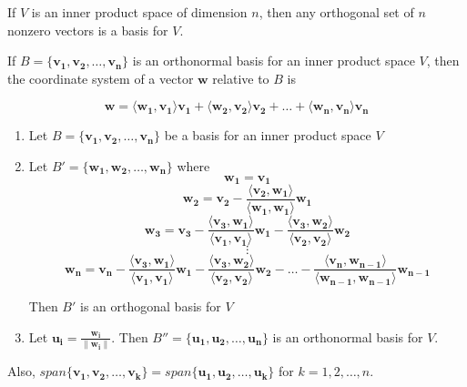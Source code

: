 \documentclass{report}
\begin{document}
\begin{tcolorbox}[title = Corollary]
	If $V$ is an inner product space of dimension $n$, then any orthogonal set of $n$ nonzero vectors is a basis for $V$.
\end{tcolorbox}

\begin{tcolorbox}[title = Coordinates Relative to an Orthonormal Basis]
	If $B= \{ \bm{v_1}, \bm{v_2}, \hdots, \bm{v_n}\}$ is an orthonormal basis for an inner product space $V$, then the coordinate system of a vector $\bm{w}$ relative to $B$ is 
	
	$$
	\bm{w} = \langle \bm{w_1}, \bm{v_1} \rangle \bm{v_1} + \langle \bm{w_2}, \bm{v_2} \rangle \bm{v_2} + \hdots + \langle \bm{w_n}, \bm{v_n} \rangle \bm{v_n}
	$$
\end{tcolorbox}

\begin{tcolorbox}[title = Gram-Schmidt Orthonormalization Process]
	\begin{enumerate}
			\item Let $B = \{ \bm{v_1}, \bm{v_2}, \hdots, \bm{v_n} \}$ be a basis for an inner product space $V$
			\item Let $B' = \{ \bm{w_1}, \bm{w_2}, \hdots, \bm{w_n} \}$ where
			$$
			\bm{w_1} = \bm{v_1}
			$$
			$$\bm{w_2} = \bm{v_2} - \frac{\langle \bm{v_2}, \bm{w_1} \rangle}{\langle \bm{w_1}, \bm{w_1} \rangle} \bm{w_1}	
			$$
			$$
			\bm{w_3} = \bm{v_3} - \frac{\langle \bm{v_3}, \bm{w_1} \rangle}{\langle \bm{v_1}, \bm{v_1} \rangle} \bm{w_1} - \frac{\langle \bm{v_3}, \bm{w_2}\rangle}{\langle \bm{v_2}, \bm{v_2} \rangle} \bm{w_2}
			$$
			$$
			\vdots
			$$
			$$
			\bm{w_n} = \bm{v_n} - \frac{\langle \bm{v_3}, \bm{w_1} \rangle}{\langle \bm{v_1}, \bm{v_1} \rangle} \bm{w_1} - \frac{\langle \bm{v_3}, \bm{w_2}\rangle}{\langle \bm{v_2}, \bm{v_2} \rangle} \bm{w_2} - \hdots - \frac{\langle \bm{v_n}, \bm{w_{n-1}} \rangle}{\langle \bm{w_{n-1}}, \bm{w_{n-1}} \rangle} \bm{w_{n-1}}
			$$
			
			Then $B'$ is an orthogonal basis for $V$
			
			\item Let $\bm{u_i} = \frac{\bm{w_i}}{\| \bm{w_i} \|}$. Then $B'' = \{ \bm{u_1}, \bm{u_2}, \hdots, \bm{u_n}\}$ is an orthonormal basis for $V$.	
			
	\end{enumerate}
	
	Also, $span\{ \bm{v_1}, \bm{v_2}, \hdots, \bm{v_k}\} = span \{\bm{u_1}, \bm{u_2}, \hdots, \bm{u_k}\}$ for $k = 1, 2, \hdots, n$.	
\end{tcolorbox}
\end{document}
